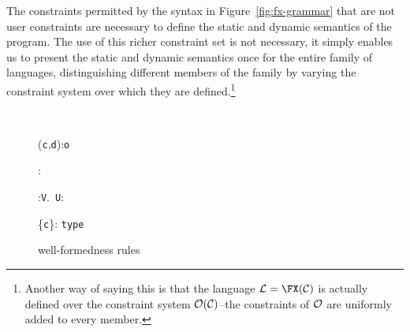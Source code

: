 The constraints permitted by the syntax in
Figure~\ref{fig:fx-grammar} that
are not user constraints are necessary to define the static and
dynamic semantics of the program.
The use of this richer constraint set is
not necessary, it simply enables us to present the static and dynamic
semantics once for the entire family of \FX{} languages,
distinguishing different members of the family by varying the
constraint system over which they are defined.\footnote{Another way of
saying this is that the language ${\cal L}=\FX({\cal C})$ is actually
defined over the constraint system ${\cal O}({\cal C})$--the constraints
of $\cal O$ are uniformly added to every \FX{} member.}


\begin{figure}
\quad\\[-12pt]

	{\Gamma \vdash ({\tt c},{\tt d}):{\tt o}}



	{\Gamma {} : \type} 

	{\Gamma \vdash {}:{\tt V}.~{\tt U}: \type} 

	{\Gamma {}\{{\tt c}\}: {\tt type}} 
\caption{\FX{} well-formedness rules}
\end{figure}


